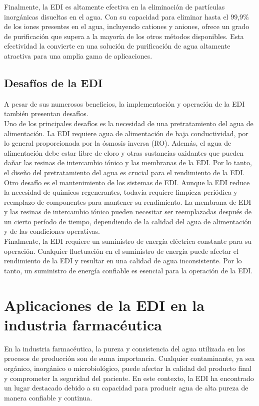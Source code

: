 Finalmente, la EDI es altamente efectiva en la eliminación de partículas inorgánicas disueltas en el agua. Con su capacidad
para eliminar hasta el 99,9\% de los iones presentes en el agua, incluyendo cationes y aniones, ofrece un grado de purificación
que supera a la mayoría de los otros métodos disponibles. Esta efectividad la convierte en una solución de purificación de
agua altamente atractiva para una amplia gama de aplicaciones.

\subsection{Desafíos de la EDI}
A pesar de sus numerosos beneficios, la implementación y operación de la EDI también presentan desafíos. \\

Uno de los principales desafíos es la necesidad de una pretratamiento del agua de alimentación. La EDI requiere agua de alimentación
de baja conductividad, por lo general proporcionada por la ósmosis inversa (RO). Además, el agua de alimentación debe estar libre
de cloro y otras sustancias oxidantes que pueden dañar las resinas de intercambio iónico y las membranas de la EDI. Por lo tanto,
el diseño del pretratamiento del agua es crucial para el rendimiento de la EDI. \\

Otro desafío es el mantenimiento de los sistemas de EDI. Aunque la EDI reduce la necesidad de químicos regenerantes, todavía requiere
limpieza periódica y reemplazo de componentes para mantener su rendimiento. La membrana de EDI y las resinas de intercambio iónico
pueden necesitar ser reemplazadas después de un cierto período de tiempo, dependiendo de la calidad del agua de alimentación y de las
condiciones operativas. \\

Finalmente, la EDI requiere un suministro de energía eléctrica constante para su operación. Cualquier fluctuación en el suministro
de energía puede afectar el rendimiento de la EDI y resultar en una calidad de agua inconsistente. Por lo tanto, un suministro de
energía confiable es esencial para la operación de la EDI. \\

\section{Aplicaciones de la EDI en la industria farmacéutica}
En la industria farmacéutica, la pureza y consistencia del agua utilizada en los procesos de producción son de suma importancia.
Cualquier contaminante, ya sea orgánico, inorgánico o microbiológico, puede afectar la calidad del producto final y comprometer la
seguridad del paciente. En este contexto, la EDI ha encontrado un lugar destacado debido a su capacidad para producir agua de alta
pureza de manera confiable y continua.

